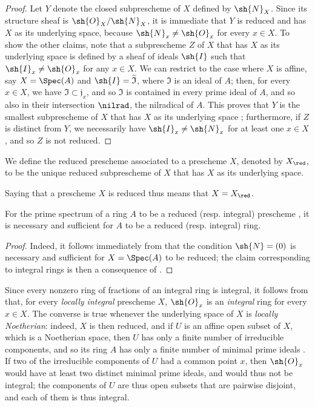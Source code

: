 \begin{proof}
Let $Y$ denote the closed subprescheme of $X$ defined by $\sh{N}_X$.
Since its structure sheaf is $\sh{O}_X/\sh{N}_X$, it is immediate that $Y$ is reduced and has $X$ as its underlying space, because $\sh{N}_x\neq\sh{O}_x$ for every $x\in X$.
To show the other claims, note that a subprescheme $Z$ of $X$ that has $X$ as its underlying space is defined by a sheaf of ideals $\sh{I}$  such that $\sh{I}_x\neq\sh{O}_x$ for any $x\in X$.
We can restrict to the case where $X$ is affine, say $X=\Spec(A)$ and $\sh{I}=\widetilde{\mathfrak{I}}$, where $\mathfrak{I}$ is an ideal of $A$;
then, for every $x\in X$, we have $\mathfrak{I}\subset\mathfrak{j}_x$, and so $\mathfrak{I}$ is contained in every prime ideal of $A$, and so also in their intersection $\nilrad$, the nilradical of $A$.
This proves that $Y$ is the smallest subprescheme of $X$ that has $X$ as its underlying space ;
furthermore, if $Z$ is distinct from $Y$, we necessarily have $\sh{I}_x\neq\sh{N}_x$ for at least one $x\in X$, and so  $Z$ is not reduced.
\end{proof}

\begin{definition}[5.1.3]
\label{I.5.1.3}
We define the reduced prescheme associated to a prescheme $X$, denoted by $X_\red$, to be the unique reduced subprescheme of $X$ that has $X$ as its underlying space.
\end{definition}

Saying that a prescheme $X$ is reduced thus means that $X=X_\red$.

\begin{proposition}[5.1.4]
\label{I.5.1.4}
For the prime spectrum of a ring $A$ to be a reduced (resp. integral) prescheme , it is necessary and sufficient for $A$ to be a reduced (resp. integral) ring.
\end{proposition}

\begin{proof}
Indeed, it follows immediately from  that the condition $\sh{N}=(0)$ is necessary and sufficient for $X=\Spec(A)$ to be reduced;
the claim corresponding to integral rings is then a consequence of .
\end{proof}

Since every nonzero ring of fractions of an integral ring is integral, it follows from  that, for every \emph{locally integral} prescheme $X$, $\sh{O}_x$ is an \emph{integral} ring for every $x\in X$.
The converse is true whenever the underlying space of $X$ is \emph{locally Noetherian}:
indeed, $X$ is then reduced, and if $U$ is an affine open subset of $X$, which is a Noetherian space, then $U$ has only a finite number of irreducible components, and so its ring $A$ has only a finite number of minimal prime ideals .
If two of the irreducible components of $U$ had a common point $x$, then $\sh{O}_x$ would have at least two distinct minimal prime ideals, and would thus not be integral;
the components of $U$ are thus open subsets that are pairwise disjoint, and each of them is thus integral.

